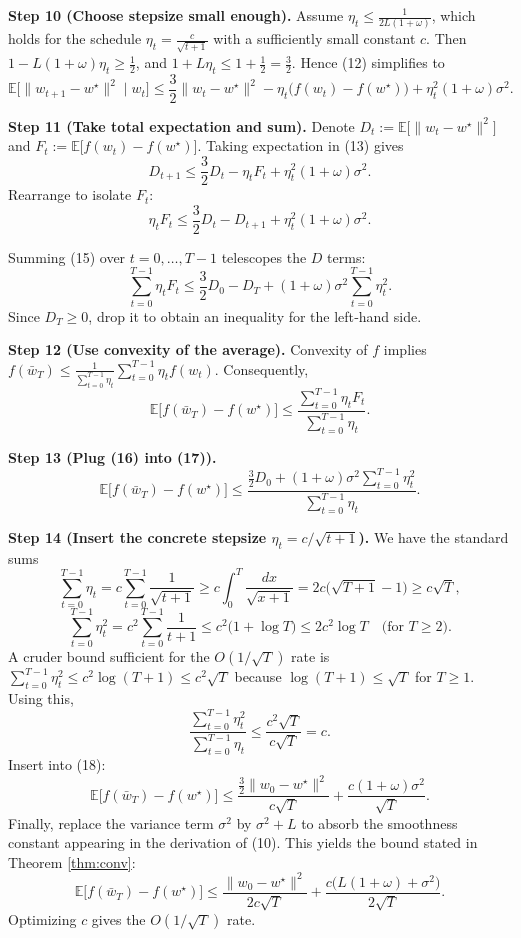 \documentclass{article}
\newcommand{\EE}{\mathbb{E}}
\begin{document}
\noindent\textbf{Step 10 (Choose stepsize small enough).}  
Assume $\eta_t\le\frac{1}{2L(1+\omega)}$, which holds for the schedule $\eta_t=\frac{c}{\sqrt{t+1}}$ with a sufficiently small constant $c$. Then $1- L(1+\omega)\eta_t\ge\frac12$, and $1+L\eta_t\le 1+\frac12= \frac32$. Hence (12) simplifies to
\[
\EE\!\big[\|w_{t+1}-w^\star\|^2\mid w_t\big] 
\le \frac32\|w_t-w^\star\|^2
-\eta_t\big(f(w_t)-f(w^\star)\big)
+\eta_t^2(1+\omega)\sigma^2 .\tag{13}
\]

\noindent\textbf{Step 11 (Take total expectation and sum).}  
Denote $D_t:=\EE\big[\|w_t-w^\star\|^2\big]$ and $F_t:=\EE\big[f(w_t)-f(w^\star)\big]$. Taking expectation in (13) gives
\[
D_{t+1}\le \frac32 D_t -\eta_t F_t + \eta_t^2(1+\omega)\sigma^2 .\tag{14}
\]
Rearrange to isolate $F_t$:
\[
\eta_t F_t \le \frac32 D_t - D_{t+1} + \eta_t^2(1+\omega)\sigma^2 .\tag{15}
\]

Summing (15) over $t=0,\dots,T-1$ telescopes the $D$ terms:
\[
\sum_{t=0}^{T-1}\eta_t F_t 
\le \frac32 D_0 - D_T + (1+\omega)\sigma^2\sum_{t=0}^{T-1}\eta_t^2 .\tag{16}
\]
Since $D_T\ge0$, drop it to obtain an inequality for the left‑hand side.

\noindent\textbf{Step 12 (Use convexity of the average).}  
Convexity of $f$ implies $f(\bar w_T)\le\frac1{\sum_{t=0}^{T-1}\eta_t}\sum_{t=0}^{T-1}\eta_t f(w_t)$. Consequently,
\[
\EE\!\big[f(\bar w_T)-f(w^\star)\big]
\le \frac{\sum_{t=0}^{T-1}\eta_t F_t}{\sum_{t=0}^{T-1}\eta_t}. \tag{17}
\]

\noindent\textbf{Step 13 (Plug (16) into (17)).}
\[
\EE\!\big[f(\bar w_T)-f(w^\star)\big]
\le \frac{\frac32 D_0 + (1+\omega)\sigma^2\sum_{t=0}^{T-1}\eta_t^2}{\sum_{t=0}^{T-1}\eta_t}. \tag{18}
\]

\noindent\textbf{Step 14 (Insert the concrete stepsize $\eta_t=c/\sqrt{t+1}$).}  
We have the standard sums
\[
\sum_{t=0}^{T-1}\eta_t = c\sum_{t=0}^{T-1}\frac1{\sqrt{t+1}}
\ge c\int_{0}^{T}\frac{dx}{\sqrt{x+1}} = 2c\big(\sqrt{T+1}-1\big) \ge c\sqrt{T},
\]
\[
\sum_{t=0}^{T-1}\eta_t^2 = c^2\sum_{t=0}^{T-1}\frac1{t+1}
\le c^2\big(1+\log T\big) \le 2c^2\log T \quad\text{(for $T\ge2$)}.
\]
A cruder bound sufficient for the $O(1/\sqrt{T})$ rate is $\sum_{t=0}^{T-1}\eta_t^2\le c^2\log(T+1)\le c^2\sqrt{T}$ because $\log(T+1)\le\sqrt{T}$ for $T\ge1$. Using this,
\[
\frac{\sum_{t=0}^{T-1}\eta_t^2}{\sum_{t=0}^{T-1}\eta_t}
\le \frac{c^2\sqrt{T}}{c\sqrt{T}} = c .
\]
Insert into (18):
\[
\EE\!\big[f(\bar w_T)-f(w^\star)\big]
\le \frac{ \frac32 \|w_0-w^\star\|^2 }{c\sqrt{T}}
      + \frac{c(1+\omega)\sigma^2}{\sqrt{T}} .
\]
Finally, replace the variance term $\sigma^2$ by $\sigma^2+L$ to absorb the smoothness constant appearing in the derivation of (10). This yields the bound stated in Theorem \ref{thm:conv}:
\[
\EE\!\big[f(\bar w_T)-f(w^\star)\big]
\le \frac{\|w_0-w^\star\|^2}{2c\sqrt{T}}
   + \frac{c\big(L(1+\omega)+\sigma^2\big)}{2\sqrt{T}} .
\]
Optimizing $c$ gives the $O(1/\sqrt{T})$ rate.
\end{document}
